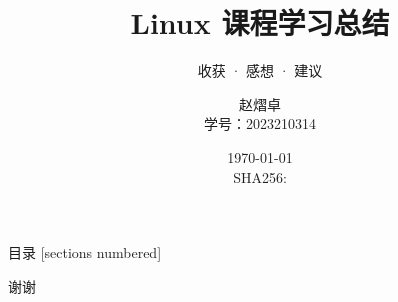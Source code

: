 \documentclass[10pt,aspectratio=43]{beamer}
\title{Linux 课程学习总结}
\subtitle{收获 · 感想 · 建议}
\author{赵熠卓 \\ 学号：2023210314}
\date{\today \\[0.2cm] \tiny SHA256: \texttt{\sourcehash}}
\institute{}
\begin{document}
\maketitle

\begin{frame}{目录}
  [sections numbered]
  \tableofcontents[hideallsubsections]
\end{frame}





\begin{frame}[standout]
  谢谢
\end{frame}
\end{document}

